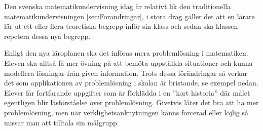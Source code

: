 \textcolor{WildStrawberry}{
    Den svenska matematikundervisning idag är relativt lik den traditionella matematikundervisningen \ref{sec:Forandringar}, i stora drag gäller det att en lärare lär ut ett eller flera teoretiska begrepp inför sin klass och sedan ska klassen repetera dessa nya begrepp. }
    







\textcolor{WildStrawberry}{
    Enligt den nya läroplanen ska det införas mera problemlösning i matematiken. Eleven ska alltså få mer övning på att bemöta uppställda situationer och kunna modellera lösningar från given information. Trots dessa förändringar så verkar det som applikationen av problemlösning i skolan är bristande, se exempel nedan. Elever får fortfarande uppgifter som är förklädda i en ''kort historia'' där målet egentligen blir läsförståelse över problemlösning. Givetvis låter det bra att ha mer problemlösning, men när verklighetsanknytningen känns forcerad eller löjlig så missar man att tilltala sin målgrupp.
}

